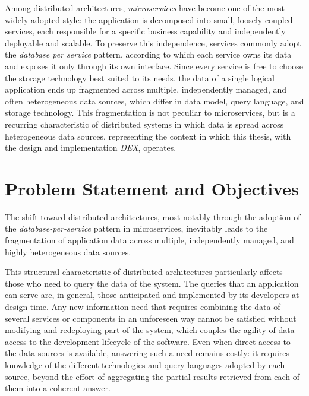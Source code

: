Among distributed architectures, \textit{microservices} have become one of the
most widely adopted style: the application is decomposed into small, loosely
coupled services, each responsible for a specific business capability and
independently deployable and scalable. To preserve this independence, services
commonly adopt the \textit{database per service} pattern, according to which
each service owns its data and exposes it only through its own interface. Since
every service is free to choose the storage technology best suited to its needs,
the data of a single logical application ends up fragmented across multiple,
independently managed, and often heterogeneous data sources, which differ in
data model, query language, and storage technology. This fragmentation is not
peculiar to microservices, but is a recurring characteristic of distributed
systems in which data is spread across heterogeneous data sources, representing
the context in which this thesis, with the design and implementation
\textit{DEX}, operates. 
 

\section{Problem Statement and Objectives}
The shift toward distributed architectures, most notably through the adoption of
the \textit{database-per-service} pattern in microservices, inevitably leads to
the fragmentation of application data across multiple, independently managed,
and highly heterogeneous data sources. 

This structural characteristic of distributed architectures particularly
affects those who need to query the data of the system. The queries that an
application can serve are, in general, those anticipated and implemented by its
developers at design time. Any new information need that requires combining the
data of several services or components in an unforeseen way cannot be satisfied
without modifying and redeploying part of the system, which couples the agility
of data access to the development lifecycle of the software. Even when direct
access to the data sources is available, answering such a need remains costly:
it requires knowledge of the different technologies and query languages adopted
by each source, beyond the effort of aggregating the partial results retrieved
from each of them into a coherent answer. 

